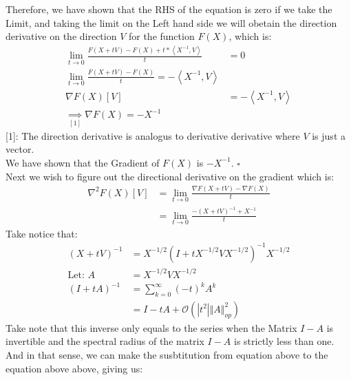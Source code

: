 \documentclass[]{article}
\begin{document}
        Therefore, we have shown that the RHS of the equation is zero if we take the Limit, and taking the limit on the Left hand side we will obetain the direction derivative on the direction $V$ for the function $F(X)$, which is: 
        \begin{align*}\tag{12.3.3.7}\label{eqn:12.3.3.7}
            \lim_{t\rightarrow 0} 
            \frac{
                F(X + tV) - F(X) + t * \left\langle X^{-1}, V\right\rangle
            }
            {t} &= 0
            \\
            \lim_{t\rightarrow 0} \frac{F(X + tV) - F(X)}{t} = - \left\langle X^{-1}, V \right\rangle
            \\
            \nabla F(X)[V] &= - \left\langle X^{-1}, V \right\rangle
            \\
            \underset{[1]}{\implies}
            \nabla F(X) = - X^{-1}
        \end{align*}
        [1]: The direction derivative is analogus to derivative derivative where $V$ is just a vector. 
        \\
        We have shown that the Gradient of $F(X)$ is $-X^{-1}$. 
        $\square$
        \\
        Next we wish to figure out the directional derivative on the gradient which is: 
        \begin{align*}\tag{12.3.3.8}\label{eqn:12.3.3.8}
            \nabla^2F(X)[V] &= \lim_{t\rightarrow 0}
            \frac{\nabla F(X + tV) - \nabla F(X)}{t}
            \\
            &= \lim_{t\rightarrow 0} \frac{-(X  +tV)^{-1} + X^{-1}}{t}
        \end{align*}
        Take notice that: 
        \begin{align*}\tag{12.3.3.9}\label{eqn:12.3.3.9}
            (X + tV)^{-1} &= X^{-1/2}(I + tX^{-1/2}VX^{-1/2})^{-1} X^{-1/2}
            \\
            \text{Let: }A &= X^{-1/2}VX^{-1/2}
            \\
            (I + tA)^{-1} &= \sum_{k = 0}^{\infty}(-t)^{k}A^k
            \\
            &= I - tA + \mathcal{O}(|t^2| \Vert A\Vert_{op}^2)
        \end{align*}
        Take note that this inverse only equals to the series when the Matrix $I - A$ is invertible and the spectral radius of the matrix $I - A$ is strictly less than one. 
        \\
        And in that sense, we can make the susbtitution from equation above to the equation above above, giving us: 
\end{document}
